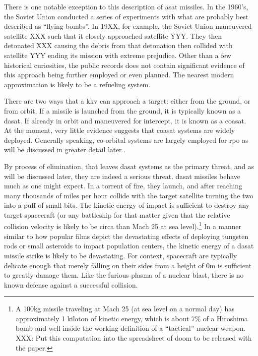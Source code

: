 There is one notable exception to this description of \ac{asat}
missiles.  In the 1960's, the Soviet Union conducted a series of
experiments with what are probably best described as ``flying
bombs''.\cite[xxx]{brian} In 19XX, for example, the Soviet Union
maneuvered satellite XXX such that it closely approached satellite
YYY.\cite[brian or grego]{xxx} They then detonated XXX causing the
debris from that detonation then collided with satellite YYY ending
its mission with extreme prejudice.\cite[xxx pick something]{xxx}
Other than a few historical curiosities, the public records does not
contain significant evidence of this approach being further employed
or even planned.  The nearest modern approximation is likely to be a
refueling system.

There are two ways that a \ac{kkv} can approach a target: either from
the ground, or from orbit.\cite[overview of asat missile paper
  needed]{xxx} If a missile is launched from the ground, it is
typically known as a \acf{dasat}.\cite[definition from brian?]{xxx} If
already in orbit and maneuvered for intercept, it is known as a
\acf{coasat}.\cite[definition from brian?]{xxx} At the moment, very
little evidence suggests that \ac{coasat} systems are widely deployed.
Generally speaking, co-orbital systems are largely employed for
\acf{rpo} as will be discussed in greater detail
later.\cite[xxx]{brian}.

By process of elimination, that leaves \ac{dasat} systems as the
primary threat, and as will be discussed later, they are indeed a
serious threat.  \ac{dasat} missiles behave much as one might expect.
In a torrent of fire, they launch, and after reaching many thousands
of miles per hour collide with the target satellite turning the two
into a puff of small bits.\cite[kkv impact simulation]{xxx} The
kinetic energy of impact is sufficient to destroy any target
spacecraft (or any battleship for that matter given that the relative
collision velocity is likely to be circa than Mach 25 at sea
level).\footnote{A 100kg missile traveling at Mach 25 (at sea level on
a normal day) has approximately 1 kiloton of kinetic energy, which is
about 7\% of a Hiroshima bomb and well inside the working definition
of a ``tactical'' nuclear weapon. XXX: Put this computation into the
spreadsheet of doom to be released with the paper.} In a manner
similar to how popular films depict the devastating effects of
deploying tungsten rods or small asteroids to impact population
centers, the kinetic energy of a \ac{dasat} missile strike is likely
to be devastating.  For context, spacecraft are typically delicate
enough that merely falling on their sides from a height of 0m is
sufficient to greatly damage them.\cite{whoopsies} Like the furious
plasma of a nuclear blast, there is no known defense against a
successful collision.


